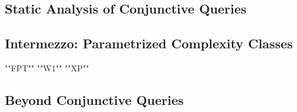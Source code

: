 \subsection{Static Analysis of Conjunctive Queries}

\subsection{Intermezzo: Parametrized Complexity Classes}

\begin{itemize}
	\itemAP ""FPT""
	\itemAP ""W1""
	\itemAP ""XP""
\end{itemize}

\subsection{Beyond Conjunctive Queries}